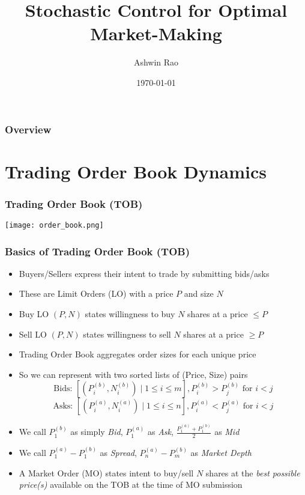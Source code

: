 \documentclass[handout]{beamer}
\title[Optimal Market-Making]{Stochastic Control for Optimal Market-Making} %
\author{Ashwin Rao} %
\institute[Stanford] %
{
ICME, Stanford University
}
\date{\today} %
\begin{document}
\begin{frame}
\titlepage %
\end{frame}

\begin{frame}
\frametitle{Overview} %
\tableofcontents %
\end{frame}

\section{Trading Order Book Dynamics}

\begin{frame}
\frametitle{Trading Order Book (TOB)}
\texttt{[image: order\_book.png]}
\end{frame}

\begin{frame}
\frametitle{Basics of Trading Order Book (TOB)}
\pause
\begin{itemize}[<+->]
\item Buyers/Sellers express their intent to trade by submitting bids/asks
\item These are Limit Orders (LO) with a price $P$ and size $N$
\item Buy LO $(P, N)$ states willingness to buy $N$ shares at a price $\leq P$
\item Sell  LO $(P, N)$ states willingness to sell $N$ shares at a price $\geq P$
\item Trading Order Book aggregates order sizes for each unique price
\item So we can represent with two sorted lists of (Price, Size) pairs
$$\mbox{Bids: } [(P_i^{(b)}, N_i^{(b)}) \mid 1 \leq i \leq m], P_i^{(b)} > P_j^{(b)} \mbox{ for } i < j$$
$$\mbox{Asks: } [(P_i^{(a)}, N_i^{(a)}) \mid 1 \leq i \leq n], P_i^{(a)} < P_j^{(a)} \mbox{ for } i < j$$
\item We call $P_1^{(b)}$ as simply {\em Bid}, $P_1^{(a)}$ as {\em Ask}, $\frac {P_1^{(a)} + P_1^{(b)}} 2$ as {\em Mid}
\item We call $P_1^{(a)} - P_1^{(b)}$ as {\em Spread}, $P_n^{(a)} - P_m^{(b)}$ as {\em Market Depth}
\item A Market Order (MO) states intent to buy/sell $N$ shares at the {\em best possible price(s)} available on the TOB at the time of MO submission
\end{itemize}
\end{frame}
\end{document}
